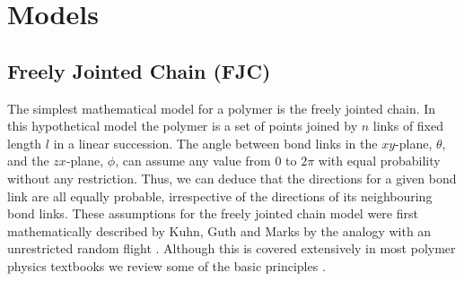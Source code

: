 \chapter{Models}

\section{Freely Jointed Chain (FJC)}

The simplest mathematical model for a polymer is the freely jointed chain. In this hypothetical model the polymer is a set of points joined by $n$ links of fixed length $l$ in a linear succession. The angle between bond links in the $xy$-plane, $\theta$, and the $zx$-plane, $\phi$, can assume any value from $0$ to $2\pi$ with equal probability without any restriction. Thus, we can deduce that the directions for a given bond link are all equally probable, irrespective of the directions of its neighbouring bond links. These assumptions for the freely jointed chain model were first mathematically described by Kuhn, Guth and Marks by the analogy with an unrestricted random flight \cite{Flory1975,Flory1971}. Although this  is covered extensively in most polymer physics textbooks we review some of the basic principles \cite{Sperling2006,Plischke2006,DeGennes1979,Doi1988}.

